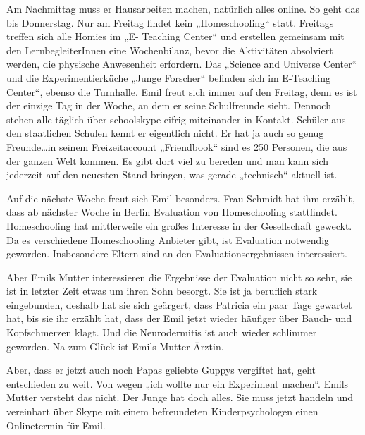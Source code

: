 \documentclass[12pt,a4paper]{article}
\begin{document}
\begin{appendix}
Am Nachmittag muss er Hausarbeiten machen, natürlich alles online. So geht das bis Donnerstag. Nur am Freitag findet kein „Homeschooling“ statt. Freitags treffen sich alle Homies im „E- Teaching Center“ und erstellen gemeinsam mit den LernbegleiterInnen eine Wochenbilanz, bevor die Aktivitäten absolviert werden, die physische Anwesenheit erfordern. Das „Science and Universe Center“ und die Experimentierküche „Junge Forscher“ befinden sich im E-Teaching Center“, ebenso die Turnhalle. Emil freut sich immer auf den Freitag, denn es ist der einzige Tag in der Woche, an dem er seine Schulfreunde sieht. Dennoch stehen alle täglich über schoolskype eifrig miteinander in Kontakt. Schüler aus den staatlichen Schulen kennt er eigentlich nicht. Er hat ja auch so genug Freunde…in seinem Freizeitaccount „Friendbook“ sind es 250 Personen, die  aus der ganzen Welt kommen. Es gibt dort viel zu bereden und man kann sich jederzeit auf den neuesten Stand bringen, was gerade „technisch“ aktuell ist.

Auf die nächste Woche freut sich Emil besonders. Frau Schmidt hat ihm erzählt, dass ab nächster Woche in Berlin Evaluation von Homeschooling stattfindet. Homeschooling hat mittlerweile ein großes Interesse in der Gesellschaft geweckt. Da es verschiedene Homeschooling Anbieter gibt, ist Evaluation notwendig geworden. Insbesondere Eltern sind an den Evaluationsergebnissen interessiert.

Aber Emils Mutter interessieren die Ergebnisse der Evaluation nicht so sehr, sie ist in letzter Zeit etwas um ihren Sohn besorgt. Sie ist ja beruflich stark eingebunden, deshalb hat sie sich geärgert, dass Patricia ein paar Tage gewartet hat, bis sie ihr erzählt hat, dass der Emil jetzt wieder häufiger über Bauch- und Kopfschmerzen klagt. Und die Neurodermitis ist auch wieder schlimmer geworden. Na zum Glück ist Emils Mutter Ärztin.

Aber, dass er jetzt auch noch Papas geliebte Guppys vergiftet hat, geht entschieden zu weit. Von wegen „ich wollte nur ein Experiment machen“. Emils Mutter versteht das nicht. Der Junge hat doch alles. Sie muss jetzt handeln und vereinbart über Skype mit einem befreundeten Kinderpsychologen einen Onlinetermin für Emil.
\pagebreak

\end{appendix}
\end{document}
